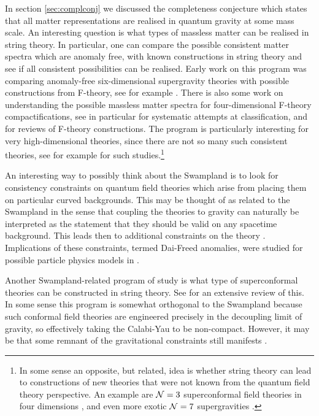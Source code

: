 \documentclass[11pt,a4paper]{article}
\numberwithin{equation}{section}
\numberwithin{table}{section}\setlength{\multlinegap}{25pt}
\begin{document}
{In section \ref{sec:complconj} we discussed the completeness conjecture which states that all matter representations are realised in quantum gravity at some mass scale. An interesting question is what types of massless matter can be realised in string theory. In particular, one can compare the possible consistent matter spectra which are anomaly free, with known constructions in string theory and see if all consistent possibilities can be realised. Early work on this program was comparing anomaly-free six-dimensional supergravity theories with possible constructions from F-theory, see for example \cite{Kumar:2009ae,Seiberg:2011dr,Kumar:2009us,Kumar:2009ac,Kumar:2010ru,Taylor:2018khc}. There is also some work on understanding the possible massless matter spectra for four-dimensional F-theory compactifications, see in particular \cite{Lawrie:2015hia,Baume:2015wia,Cvetic:2017epq} for systematic attempts at classification, and \cite{Maharana:2012tu,Weigand:2018rez} for reviews of F-theory constructions. The program is particularly interesting for very high-dimensional theories, since there are not so many such consistent theories, see for example \cite{Garcia-Etxebarria:2017crf} for such studies.\footnote{In some sense an opposite, but related, idea is whether string theory can lead to constructions of new theories that were not known from the quantum field theory perspective. An example are ${\cal N}=3$ superconformal field theories in four dimensions \cite{Garcia-Etxebarria:2015wns}, and even more exotic ${\cal N}=7$ supergravities \cite{Ferrara:2018iko}.}

An interesting way to possibly think about the Swampland is to look for consistency constraints on quantum field theories which arise from placing them on particular curved backgrounds. This may be thought of as related to the Swampland in the sense that coupling the theories to gravity can naturally be interpreted as the statement that they should be valid on any spacetime background. This leads then to additional constraints on the theory \cite{Kapustin:2014dxa,Hsieh:2015xaa,Witten:2015aba}. Implications of these constraints, termed Dai-Freed anomalies, were studied for possible particle physics models in \cite{Wang:2018cai,Wang:2018qoy,Garcia-Etxebarria:2018ajm}.

Another Swampland-related program of study is what type of superconformal theories can be constructed in string theory. See \cite{Heckman:2018jxk} for an extensive review of this. In some sense this program is somewhat orthogonal to the Swampland because such conformal field theories are engineered precisely in the decoupling limit of gravity, so effectively taking the Calabi-Yau to be non-compact. However, it may be that some remnant of the gravitational constraints still manifests \cite{Heckman:2018jxk}. 


}
\end{document}

